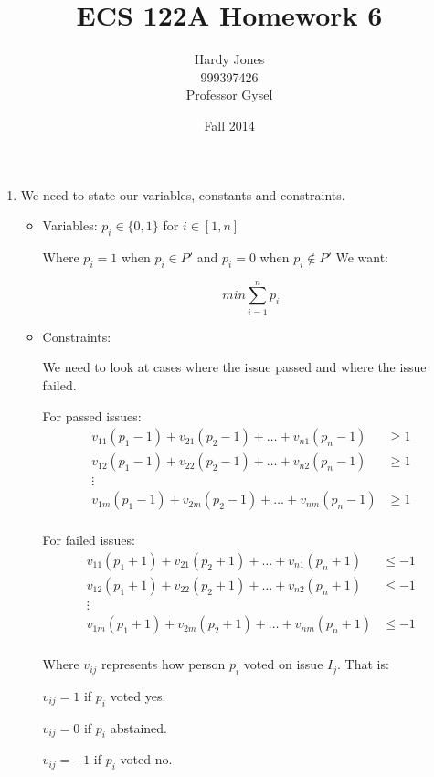 \documentclass[12pt,letterpaper]{article}
\title{ECS 122A Homework 6\vspace{-2ex}}
\author{Hardy Jones\\
        999397426\\
        Professor Gysel\vspace{-2ex}}
\date{Fall 2014}
\begin{document}
  \maketitle

  \begin{enumerate}
    \item
      We need to state our variables, constants and constraints.
      \begin{itemize}
        \item Variables:
          $p_i \in \{0, 1\}$ for $i \in [1, n]$

          Where $p_i = 1$ when $p_i \in P'$ and $p_i = 0$ when $p_i \notin P'$
          We want:

          \[
            min \sum_{i = 1}^{n}p_i
          \]
        \item Constraints:

          We need to look at cases where the issue passed and where the issue failed.

          For passed issues:
          \begin{align*}
            v_{11}(p_1 - 1) + v_{21}(p_2 - 1) + \dots + v_{n1}(p_n - 1) &\ge 1 \\
            v_{12}(p_1 - 1) + v_{22}(p_2 - 1) + \dots + v_{n2}(p_n - 1) &\ge 1 \\
            \vdots \\
            v_{1m}(p_1 - 1) + v_{2m}(p_2 - 1) + \dots + v_{nm}(p_n - 1) &\ge 1 \\
          \end{align*}

          For failed issues:
          \begin{align*}
            v_{11}(p_1 + 1) + v_{21}(p_2 + 1) + \dots + v_{n1}(p_n + 1) &\le -1 \\
            v_{12}(p_1 + 1) + v_{22}(p_2 + 1) + \dots + v_{n2}(p_n + 1) &\le -1 \\
            \vdots \\
            v_{1m}(p_1 + 1) + v_{2m}(p_2 + 1) + \dots + v_{nm}(p_n + 1) &\le -1 \\
          \end{align*}

          Where $v_{ij}$ represents how person $p_i$ voted on issue $I_j$.
          That is:

          $v_{ij} = 1$ if $p_i$ voted yes.

          $v_{ij} = 0$ if $p_i$ abstained.

          $v_{ij} = -1$ if $p_i$ voted no.
      \end{itemize}


\end{enumerate}
\end{document}
